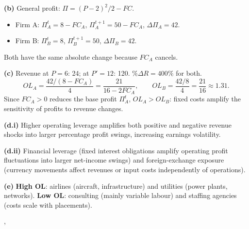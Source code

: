 {{    \textbf{(b)} General profit: $\Pi = (P-2)^2/2 - FC$.
    \begin{itemize}
      \item Firm A: $\Pi_A^t = 8 - FC_A$, $\Pi_A^{t+1} = 50 - FC_A$,
            $\Delta\Pi_A = 42$.
      \item Firm B: $\Pi_B^t = 8$, $\Pi_B^{t+1} = 50$,
            $\Delta\Pi_B = 42$.
    \end{itemize}
    Both have the same absolute change because $FC_A$ cancels.

    \textbf{(c)} Revenue at $P=6$: 24; at $P'=12$: 120.
    $\%\Delta R = 400\%$ for both.
    \[
      OL_A = \frac{42/(8-FC_A)}{4} = \frac{21}{16-2FC_A}, \qquad
      OL_B = \frac{42/8}{4} = \frac{21}{16} \approx 1.31.
    \]
    Since $FC_A > 0$ reduces the base profit $\Pi_A^t$, $OL_A > OL_B$:
    fixed costs amplify the sensitivity of profits to revenue changes.

    \textbf{(d.i)} Higher operating leverage amplifies both positive and
    negative revenue shocks into larger percentage profit swings, increasing
    earnings volatility.

    \textbf{(d.ii)} Financial leverage (fixed interest obligations amplify
    operating profit fluctuations into larger net-income swings) and
    foreign-exchange exposure (currency movements affect revenues or input
    costs independently of operations).

    \textbf{(e)} \textbf{High OL}: airlines (aircraft, infrastructure) and
    utilities (power plants, networks). \textbf{Low OL}: consulting (mainly
    variable labour) and staffing agencies (costs scale with placements).
  },
}
